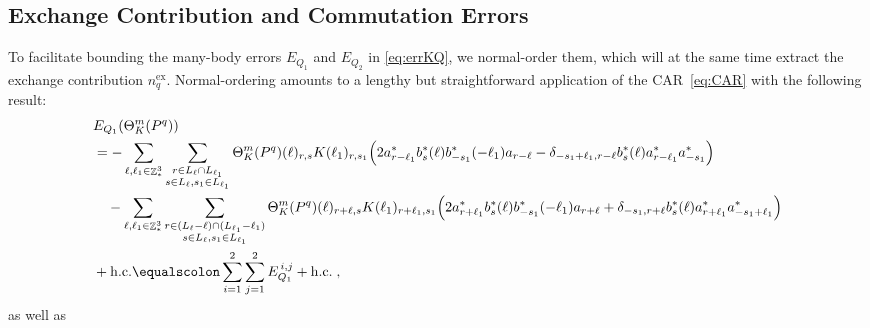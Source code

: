 \documentclass[12pt,a4paper]{article}
\numberwithin{equation}{section}
\newcommand{\1}{\mathbb{I}}
\newcommand{\ex}{\mathrm{ex}}
\DeclareMathOperator{\Z}{\mathbb{Z}}
\theoremstyle{plain}
\theoremstyle{definition}
\theoremstyle{remark}
\theoremstyle{plain}
\theoremstyle{definition}
\theoremstyle{remark}
\begin{document}
\subsection{Exchange Contribution and Commutation Errors}
\label{sec:extraction_ex}

To facilitate bounding the many-body errors $ E_{Q_1} $ and $ E_{Q_2} $ in \eqref{eq:errKQ}, we normal-order them, which will at the same time extract the exchange contribution $ n_q^{\ex} $. Normal-ordering amounts to a lengthy but straightforward application of the CAR~\eqref{eq:CAR} with the following result:
\begin{equation} \label{eq:EQ1_expansion}
\begin{aligned}
	&E_{Q_1}(\Theta^m_{K}(P^q)) \\
	&= -	\sum\limits_{\ell, \ell_1\in \Z^3_*}\sum\limits_{\substack{r\in L_{\ell} \cap L_{\ell_1}\\ s \in L_{\ell},s_1\in L_{\ell_1}}} \Theta^m_{K}(P^q)(\ell)_{r,s}K(\ell_1)_{r,s_1}
		\Big( 2a^*_{r-\ell_1}b^*_{s}(\ell) b^*_{-s_1}(-\ell_1)a_{r-\ell} 
		-\delta_{-s_1+\ell_1,r-\ell} b^*_{s}(\ell) a^*_{r-\ell_1}a^*_{-s_1} \Big) \\
	&\quad -\sum\limits_{\ell, \ell_1\in \Z^3_*}\sum\limits_{\substack{r\in (L_{\ell}-\ell) \cap (L_{\ell_1}-\ell_1)\\ s \in L_{\ell},s_1\in L_{\ell_1} }}
	\Theta^m_{K}(P^q)(\ell)_{r+\ell,s} K(\ell_1)_{r+\ell_1,s_1}
		\Big( 2a^*_{r+\ell_1}b^*_{s}(\ell) b^*_{-s_1}(-\ell_1) a_{r+\ell} 
		+ \delta_{-s_1,r+\ell} b^*_{s}(\ell) a^*_{r+\ell_1}a^*_{-s_1+\ell_1}\Big)\\
	&+ \mathrm{h.c.} \equalscolon \sum\limits_{i=1}^{2}\sum\limits_{j=1}^{2} E_{Q_1}^{\,i,j} + \mathrm{h.c.} \;,
\end{aligned}
\end{equation}
as well as
\end{document}
